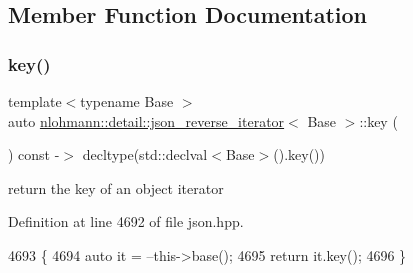 \subsection{Member Function Documentation}
\mbox{\label{classnlohmann_1_1detail_1_1json__reverse__iterator_adc648a641e8e9a1072c5abd56ad06401}} 
\subsubsection{\texorpdfstring{key()}{key()}}
{\footnotesize\ttfamily template$<$typename Base $>$ \\
auto \hyperlink{classnlohmann_1_1detail_1_1json__reverse__iterator}{nlohmann\+::detail\+::json\+\_\+reverse\+\_\+iterator}$<$ Base $>$\+::key (\begin{DoxyParamCaption}{ }\end{DoxyParamCaption}) const -\/$>$ decltype(std\+::declval$<$Base$>$().key())
    \hspace{0.3cm}{\ttfamily [inline]}}



return the key of an object iterator 



Definition at line 4692 of file json.\+hpp.


\begin{DoxyCode}
4693     \{
4694         \textcolor{keyword}{auto} it = --this->base();
4695         \textcolor{keywordflow}{return} it.key();
4696     \}
\end{DoxyCode}
\mbox{\label{classnlohmann_1_1detail_1_1json__reverse__iterator_aabf172b436988e2edde22f13f27caaed}} 
